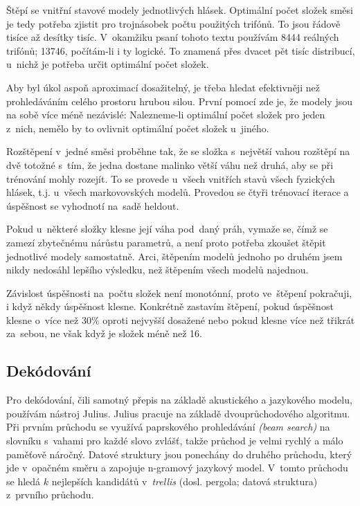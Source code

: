 \begin{enumerate}
Štěpí se vnitřní stavové modely jednotlivých hlásek. Optimální počet
složek směsi je tedy potřeba zjistit pro trojnásobek počtu použitých trifónů. To
jsou řádově tisíce až desítky tisíc. V~okamžiku psaní tohoto textu používám 8444
reálných trifónů; 13746, počítám-li i ty logické. To znamená přes dvacet pět
tisíc distribucí, u~nichž je potřeba určit optimální počet složek.

Aby byl úkol aspoň aproximací dosažitelný, je třeba hledat efektivněji než
prohledáváním celého prostoru hrubou silou. První pomocí zde je, že modely jsou
na sobě více méně nezávislé: Nalezneme-li optimální počet složek pro jeden
z~nich, nemělo by to ovlivnit optimální počet složek u~jiného.

Rozštěpení v~jedné směsi proběhne tak, že se složka s~největší vahou
rozštěpí na dvě totožné s~tím, že jedna dostane malinko větší váhu než druhá, aby se
při trénování mohly rozejít. To se provede u~všech vnitřích stavů všech
fyzických hlásek, t.j. u~všech markovovských modelů. Provedou se čtyři trénovací
iterace a úspěšnost se vyhodnotí na~sadě heldout.

Pokud u~některé složky klesne její váha pod~daný práh, vymaže se, čímž se
zamezí zbytečnému nárůstu parametrů, a není proto potřeba zkoušet štěpit
jednotlivé modely samostatně. Arci, štěpením modelů jednoho po druhém jsem nikdy nedosáhl lepšího
výsledku, než štěpením všech modelů najednou.

Závislost úspěšnosti na~počtu složek není monotónní, proto ve~štěpení pokračuji,
i když někdy úspěšnost klesne. Konkrétně zastavím štěpení, pokud úspěšnost
klesne o~více než 30\% oproti nejvyšší dosažené nebo pokud klesne více než
třikrát za~sebou, ne však když je složek méně než 16.

\end{enumerate}


\subsection{Dekódování}

Pro dekódování, čili samotný přepis na základě akustického a jazykového modelu,
používám nástroj Julius\cite{lee2001julius}. Julius pracuje na základě
dvouprůchodového algoritmu. Při prvním průchodu se využívá paprskového
prohledávání \textit{(beam search)} na slovníku s~vahami pro každé slovo zvlášť,
takže průchod je velmi rychlý a málo paměťově náročný. Datové struktury jsou
ponechány do druhého průchodu, který jde v~opačném směru a zapojuje n-gramový
jazykový model. V~tomto průchodu se hledá $k$ nejlepších kandidátů
v~\textit{trellis} (dosl. pergola; datová struktura) z~prvního průchodu.

